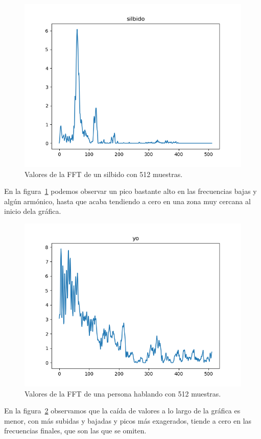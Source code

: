 \documentclass[a4paper, 12pt]{book}
\begin{document}
\begin{figure}
	\centering
	\includegraphics[width=12cm, keepaspectratio]{img/silbido512.png}
	\caption{Valores de la FFT de un silbido con 512 muestras.}\label{fig:silbido}
\end{figure}

En la figura~\ref{fig:silbido} podemos observar un pico bastante alto en las frecuencias bajas y algún armónico, hasta que acaba tendiendo a cero en una zona muy cercana al inicio dela gráfica.

\begin{figure}
	\centering
	\includegraphics[width=12cm, keepaspectratio]{img/yo512.png}
	\caption{Valores de la FFT de una persona hablando con 512 muestras.}\label{fig:yo}
\end{figure}

En la figura~\ref{fig:yo} observamos que la caída de valores a lo largo de la gráfica es menor, con más subidas y bajadas y picos más exagerados, tiende a cero en las frecuencias finales, que son las que se omiten.
\end{document}
